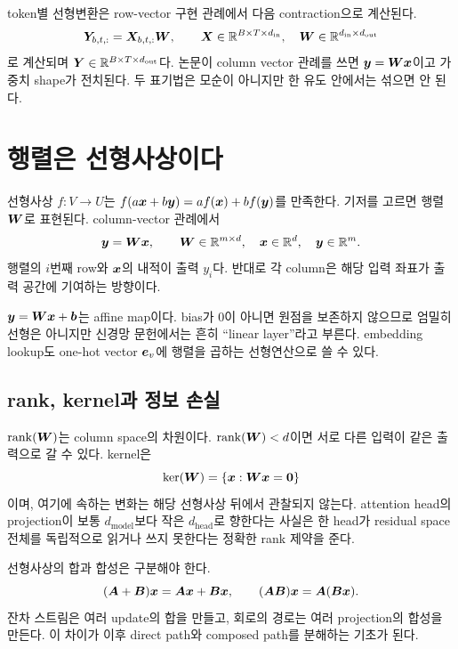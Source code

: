token별 선형변환은 row-vector 구현 관례에서 다음 contraction으로 계산된다.
\begin{equation}
  \bm{Y}_{b,t,:}=\bm{X}_{b,t,:}\bm{W},\qquad
  \bm{X}\in\mathbb{R}^{B\times T\times d_{\text{in}}},\quad
  \bm{W}\in\mathbb{R}^{d_{\text{in}}\times d_{\text{out}}}
\end{equation}
로 계산되며 $\bm{Y}\in\mathbb{R}^{B\times T\times d_{\text{out}}}$다.
논문이 column vector 관례를 쓰면 $\bm{y}=\bm{W}\bm{x}$이고 가중치 shape가 전치된다.
두 표기법은 모순이 아니지만 한 유도 안에서는 섞으면 안 된다.

\section{행렬은 선형사상이다}

선형사상 $f:V\to U$는 $f(a\bm{x}+b\bm{y})=af(\bm{x})+bf(\bm{y})$를 만족한다.
기저를 고르면 행렬 $\bm{W}$로 표현된다.
column-vector 관례에서
\begin{equation}
  \bm{y}=\bm{W}\bm{x},\qquad
  \bm{W}\in\mathbb{R}^{m\times d},\quad
  \bm{x}\in\mathbb{R}^d,\quad \bm{y}\in\mathbb{R}^m.
\end{equation}
행렬의 $i$번째 row와 $\bm{x}$의 내적이 출력 $y_i$다.
반대로 각 column은 해당 입력 좌표가 출력 공간에 기여하는 방향이다.

$\bm{y}=\bm{W}\bm{x}+\bm{b}$는 affine map이다.
bias가 0이 아니면 원점을 보존하지 않으므로 엄밀히 선형은 아니지만 신경망 문헌에서는 흔히 ``linear layer''라고 부른다.
embedding lookup도 one-hot vector $\bm{e}_{v}$에 행렬을 곱하는 선형연산으로 쓸 수 있다.

\subsection{rank, kernel과 정보 손실}

$\operatorname{rank}(\bm{W})$는 column space의 차원이다.
$\operatorname{rank}(\bm{W})<d$이면 서로 다른 입력이 같은 출력으로 갈 수 있다.
kernel은
\begin{equation}
  \ker(\bm{W})=\{\bm{x}:\bm{W}\bm{x}=\bm{0}\}
\end{equation}
이며, 여기에 속하는 변화는 해당 선형사상 뒤에서 관찰되지 않는다.
attention head의 projection이 보통 $d_{\text{model}}$보다 작은 $d_{\text{head}}$로 향한다는 사실은 한 head가 residual space 전체를 독립적으로 읽거나 쓰지 못한다는 정확한 rank 제약을 준다.

선형사상의 합과 합성은 구분해야 한다.
\begin{equation}
  (\bm{A}+\bm{B})\bm{x}
  =\bm{A}\bm{x}+\bm{B}\bm{x},\qquad
  (\bm{A}\bm{B})\bm{x}
  =\bm{A}(\bm{B}\bm{x}).
\end{equation}
잔차 스트림은 여러 update의 합을 만들고, 회로의 경로는 여러 projection의 합성을 만든다.
이 차이가 이후 direct path와 composed path를 분해하는 기초가 된다.


